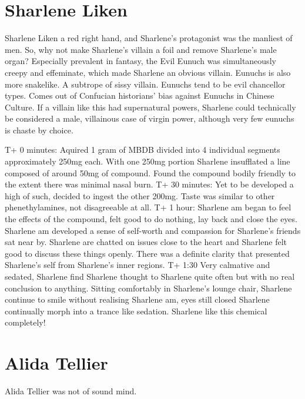 \documentclass[12pt]{book}
\begin{document}
\chapter{Sharlene Liken}

Sharlene Liken a red right hand, and Sharlene's protagonist was the manliest of men. So, why not make Sharlene's villain a foil and remove Sharlene's male organ? Especially prevalent in fantasy, the Evil Eunuch was simultaneously creepy and effeminate, which made Sharlene an obvious villain. Eunuchs is also more snakelike. A subtrope of sissy villain. Eunuchs tend to be evil chancellor types. Comes out of Confucian historians' bias against Eunuchs in Chinese Culture. If a villain like this had supernatural powers, Sharlene could technically be considered a male, villainous case of virgin power, although very few eunuchs is chaste by choice.



T+ 0 minutes: Aquired 1 gram of MBDB divided into 4 individual segments approximately 250mg each. With one 250mg portion Sharlene insufflated a line composed of around 50mg of compound. Found the compound bodily friendly to the extent there was minimal nasal burn. T+ 30 minutes: Yet to be developed a high of such, decided to ingest the other 200mg. Taste was similar to other phenethylamines, not disagreeable at all. T+ 1 hour: Sharlene am began to feel the effects of the compound, felt good to do nothing, lay back and close the eyes. Sharlene am developed a sense of self-worth and compassion for Sharlene's friends sat near by. Sharlene are chatted on issues close to the heart and Sharlene felt good to discuss these things openly. There was a definite clarity that presented Sharlene's self from Sharlene's inner regions. T+ 1:30 Very calmative and sedated, Sharlene find Sharlene thought to Sharlene quite often but with no real conclusion to anything. Sitting comfortably in Sharlene's lounge chair, Sharlene continue to smile without realising Sharlene am, eyes still closed Sharlene continually morph into a trance like sedation. Sharlene like this chemical completely!



\chapter{Alida Tellier}

Alida Tellier was not of sound mind.
\end{document}

